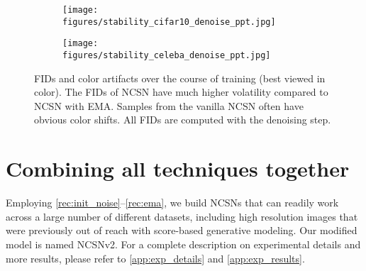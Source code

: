 \documentclass{article}
\begin{document}
\begin{figure}\centering
    \begin{subfigure}[b]{0.43\textwidth}
        \texttt{[image: figures/stability\_cifar10\_denoise\_ppt.jpg]}
    \end{subfigure}
    \begin{subfigure}[b]{0.43\textwidth}
        \texttt{[image: figures/stability\_celeba\_denoise\_ppt.jpg]}
    \end{subfigure}
    \caption{FIDs and color artifacts over the course of training (best viewed in color). The FIDs of NCSN have much higher volatility compared to NCSN with EMA. Samples from the vanilla NCSN often have obvious color shifts. All FIDs are computed with the denoising step.}
    \label{fig:stability}
\end{figure} \section{Combining all techniques together}\label{sec:experiment}
Employing \cref{rec:init_noise}--\ref{rec:ema}, we build NCSNs that can readily work across a large number of different datasets, including high resolution images that were previously 
out of reach
with score-based generative modeling. 
Our modified model is named NCSNv2. For a complete description on experimental details and more results, please refer to \cref{app:exp_details} and \ref{app:exp_results}.
\end{document}
